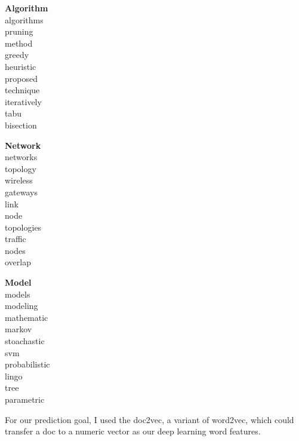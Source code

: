 \begin{minipage}{.310\textwidth}
\centering
\textbf{Algorithm} \\
algorithms  \\
pruning  \\
method  \\
greedy  \\
heuristic \\
proposed  \\
technique  \\
iteratively  \\
tabu  \\
bisection 
\end{minipage}
\begin{minipage}{.310\textwidth}
\centering
\textbf{Network} \\
networks  \\
topology  \\
wireless  \\
gateways  \\
link  \\
node  \\
topologies  \\
traffic  \\
nodes  \\
overlap 
\end{minipage}
\begin{minipage}{.310\textwidth}
\centering
\textbf{Model} \\
models \\
modeling \\
mathematic  \\
markov  \\
stoachastic \\
svm  \\
probabilistic  \\
lingo  \\
tree  \\
parametric 
\end{minipage}

For our prediction goal, I used the doc2vec, a variant of word2vec, which could
transfer a doc to a numeric vector as our deep learning word features.

